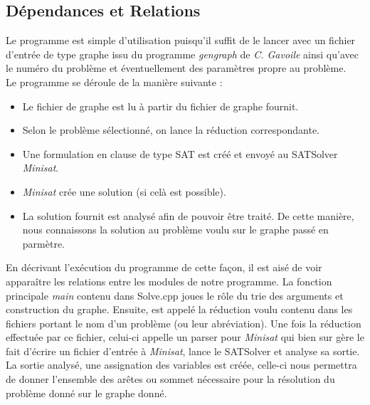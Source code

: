 \subsection{Dépendances et Relations}

Le programme est simple d'utilisation puisqu'il suffit de le lancer avec un fichier d'entrée de type graphe issu du programme \emph{gengraph} de \emph{C. Gavoile} ainsi qu'avec le numéro du problème et éventuellement des paramètres propre au problème. \\
Le programme se déroule de la manière suivante :\\
\begin{itemize}
\item Le fichier de graphe est lu à partir du fichier de graphe fournit.
\item Selon le problème sélectionné, on lance la réduction correspondante.
\item Une formulation en clause de type SAT est créé et envoyé au SATSolver \emph{Minisat}.
\item \emph{Minisat} crée une solution (si celà est possible).
\item La solution fournit est analysé afin de pouvoir être traité. De cette manière, nous connaissons la solution au problème voulu sur le graphe passé en parmètre.
\end{itemize}
En décrivant l'exécution du programme de cette façon, il est aisé de
voir apparaître les relations entre les modules de notre programme. La
fonction principale \emph{main} contenu dans Solve.cpp joues le rôle du
trie des arguments et construction du graphe. Ensuite, est appelé la
réduction voulu contenu dans les fichiers portant le nom d'un problème
(ou leur abréviation). Une fois la réduction effectuée par ce fichier,
celui-ci appelle un parser pour \emph{Minisat} qui bien sur gère le fait
d'écrire un fichier d'entrée à \emph{Minisat}, lance le SATSolver et
analyse sa sortie. La sortie analysé, une assignation des variables est
créée, celle-ci nous permettra de donner l'ensemble des arêtes ou sommet
nécessaire pour la résolution du problème donné sur le graphe donné.